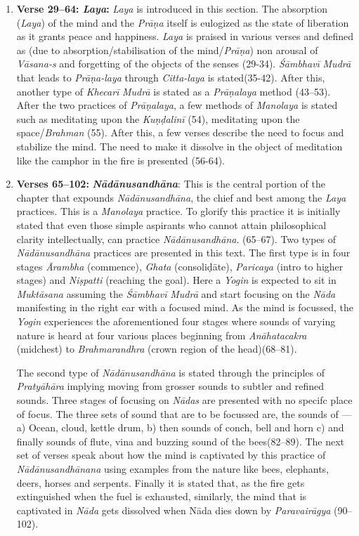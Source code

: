 \begin{enumerate}
\item \textbf{Verse 29--64: \textit{Laya}:} \textit{Laya} is introduced in this section.  The absorption (\textit{Laya}) of the mind and the \textit{Prāṇa} itself is eulogized as the state of liberation as it grants peace and happiness. \textit{Laya} is praised in various verses and defined as (due to absorption/stabilisation of the mind/\textit{Prāṇa}) non arousal of \textit{Vāsana-s} and forgetting of the objects of the senses (29-34). \textit{Śāmbhavī} \textit{Mudrā} that leads to \textit{Prāṇa-laya} through \textit{Citta-laya} is stated(35-42). After this, another type of \textit{Khecarī} \textit{Mudrā} is stated as a \textit{Prāṇalaya} method (43--53). After the two practices of \textit{Prāṇalaya}, a few methods of \textit{Manolaya} is stated such as meditating upon the \textit{Kuṇḍalinī}  (54), meditating upon the space/\textit{Brahman} (55). After this, a few verses describe the need to focus and stabilize the mind. The need to make it dissolve in the object of meditation like the camphor in the fire is presented (56-64).
\vspace{5pt}
\item \textbf{Verses 65--102:} \textit{\textbf{Nādānusandhāna}}: This is the central portion of the chapter that expounds \textit{Nādānusandhāna}, the chief and best among the \textit{Laya} practices. This is a \textit{Manolaya} practice. To glorify this practice it is initially stated that even those simple aspirants who cannot attain philosophical clarity intellectually, can practice \textit{Nādānusandhāna}. (65--67). Two types of \textit{Nādānusandhāna} practices are presented in this text. The first type is in four stages \textit{Ārambha} (commence), \textit{Ghata} (consoliḍāte), \textit{Paricaya} (intro to higher stages) and \textit{Niṣpatti} (reaching the goal). Here a \textit{Yogin} is expected to sit in \textit{Muktāsana} assuming the \textit{Śāmbhavī} \textit{Mudrā} and start focusing on the \textit{Nāda} manifesting in the right ear with a focused mind.  As the mind is focussed, the \textit{Yogin} experiences the aforementioned four stages where sounds of varying nature is heard at four various places beginning from \textit{Anāhatacakra} (midchest) to \textit{Brahmarandhra} (crown region of the head)(68--81).

\vspace{10pt}
The second type of \textit{Nādānusandhāna} is stated through the principles of \textit{Pratyāhāra} implying moving from grosser sounds to subtler and refined sounds. Three stages of focusing on \textit{Nādas} are presented with  no specifc place of focus. The three sets of sound that are to be focussed are, the sounds of --- a) Ocean, cloud, kettle drum, b) then sounds of conch, bell and horn c) and finally sounds of flute, vina and buzzing sound of the bees(82--89). The next set of verses speak about how the mind is captivated by this practice of \textit{Nādānusandhānana} using examples from the nature like bees, elephants, deers, horses and serpents. Finally it is stated that, as the fire gets extinguished when the fuel is exhausted, similarly, the mind that is captivated in \textit{Nāda} gets dissolved when Nāda dies down by \textit{Paravairāgya} (90--102).
 

\end{enumerate}
